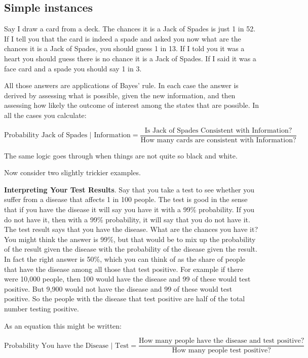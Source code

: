 \documentclass[12pt,]{book}
\begin{document}
\hypertarget{simple-instances}{%
\subsection{Simple instances}\label{simple-instances}}

Say I draw a card from a deck. The chances it is a Jack of Spades is just 1 in 52. If I tell you that the card is indeed a spade and asked you now what are the chances it is a Jack of Spades, you should guess 1 in 13. If I told you it was a heart you should guess there is no chance it is a Jack of Spades. If I said it was a face card and a spade you should say 1 in 3.

All those answers are applications of Bayes' rule. In each case the answer is derived by assessing what is possible, given the new information, and then assessing how likely the outcome of interest among the states that are possible. In all the cases you calculate:

\[\text{Probability Jack of Spades | Information} = \frac{\text{Is Jack of Spades Consistent with Information?}}{\text{How many cards are consistent with Information?}} \]

The same logic goes through when things are not quite so black and white.

Now consider two slightly trickier examples.

\textbf{Interpreting Your Test Results}. Say that you take a test to see whether you suffer from a disease that affects 1 in 100 people. The test is good in the sense that if you have the disease it will say you have it with a 99\% probability. If you do not have it, then with a 99\% probability, it will say that you do not have it. The test result says that you have the disease. What are the chances you have it? You might think the answer is 99\%, but that would be to mix up the probability of the result given the disease with the probability of the disease given the result. In fact the right answer is 50\%, which you can think of as the share of people that have the disease among all those that test positive. For example if there were 10,000 people, then 100 would have the disease and 99 of these would test positive. But 9,900 would not have the disease and 99 of these would test positive. So the people with the disease that test positive are half of the total number testing positive.

As an equation this might be written:

\[\text{Probability You have the Disease | Test} = \frac{\text{How many people have the disease and test positive?}}{\text{How many people test positive?}} \]
\end{document}
